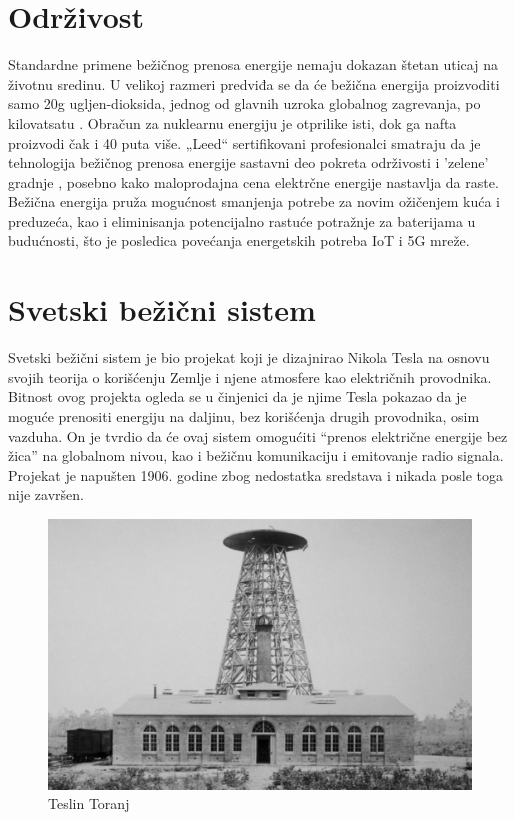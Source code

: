 \documentclass[a4paper]{article}
\begin{document}
\section{Održivost}
\label{sec:Održivost}

Standardne primene bežičnog prenosa energije nemaju dokazan štetan uticaj na životnu sredinu. U velikoj razmeri predviđa se da će bežična energija proizvoditi samo 20g ugljen-dioksida, jednog od glavnih uzroka globalnog zagrevanja, po kilovatsatu \cite{a}. Obračun za nuklearnu energiju je otprilike isti, dok ga nafta proizvodi čak i 40 puta više. „Leed“ sertifikovani profesionalci smatraju da je tehnologija bežičnog prenosa energije sastavni deo pokreta održivosti i ’zelene’ gradnje \cite{d}, posebno kako maloprodajna cena elektrčne energije nastavlja da raste. Bežična energija pruža mogućnost smanjenja potrebe za novim ožičenjem kuća i preduzeća, kao i eliminisanja potencijalno rastuće potražnje za baterijama u budućnosti, što je posledica povećanja energetskih potreba IoT i 5G mreže.     


\section{Svetski bežični sistem}
\label{sec:svetskisistem}
Svetski bežični sistem je bio projekat koji je dizajnirao Nikola Tesla na osnovu svojih teorija o korišćenju Zemlje i njene atmosfere kao električnih provodnika. Bitnost ovog projekta ogleda se u činjenici da je njime Tesla pokazao da je moguće prenositi energiju na daljinu, bez korišćenja drugih provodnika, osim vazduha. On je tvrdio da će ovaj sistem omogućiti “prenos električne energije bez žica” na globalnom nivou, kao i bežičnu komunikaciju i emitovanje radio signala. Projekat je napušten 1906. godine zbog nedostatka sredstava i nikada posle toga nije završen.

\begin{figure}[h!]
\begin{center}
\includegraphics[scale=0.25]{toranj.jpg}
\end{center}
\caption{Teslin Toranj}
\label{fig:toranj}
\end{figure}
\end{document}
